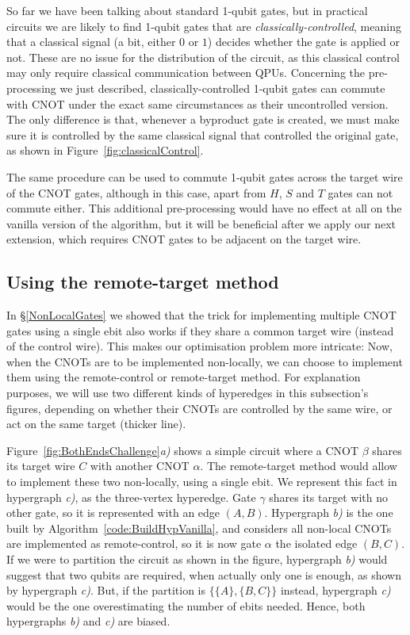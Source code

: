 So far we have been talking about standard 1-qubit gates, but in practical circuits we are likely to find 1-qubit gates that are \textit{classically-controlled}, meaning that a classical signal (a bit, either \(0\) or \(1\)) decides whether the gate is applied or not. These are no issue for the distribution of the circuit, as this classical control may only require classical communication between QPUs. Concerning the pre-processing we just described, classically-controlled 1-qubit gates can commute with CNOT under the exact same circumstances as their uncontrolled version. The only difference is that, whenever a byproduct gate is created, we must make sure it is controlled by the same classical signal that controlled the original gate, as shown in Figure~\ref{fig:classicalControl}.



The same procedure can be used to commute 1-qubit gates across the target wire of the CNOT gates, although in this case, apart from \(H\), \(S\) and \(T\) gates can not commute either. This additional pre-processing would have no effect at all on the vanilla version of the algorithm, but it will be beneficial after we apply our next extension, which requires CNOT gates to be adjacent on the target wire.


\subsection{Using the remote-target method}
\label{BothEnds}

In \S\ref{NonLocalGates} we showed that the trick for implementing multiple CNOT gates using a single ebit also works if they share a common target wire (instead of the control wire). This makes our optimisation problem more intricate: Now, when the CNOTs are to be implemented non-locally, we can choose to implement them using the remote-control or remote-target method. For explanation purposes, we will use two different kinds of hyperedges in this subsection's figures, depending on whether their CNOTs are controlled by the same wire, or act on the same target (thicker line). 



Figure~\ref{fig:BothEndsChallenge}\textit{a)} shows a simple circuit where a CNOT \(\beta\) shares its target wire \(C\) with another CNOT \(\alpha\). The remote-target method would allow to implement these two non-locally, using a single ebit. We represent this fact in hypergraph \textit{c)}, as the three-vertex hyperedge. Gate \(\gamma\) shares its target with no other gate, so it is represented with an edge \((A,B)\). Hypergraph \textit{b)} is the one built by Algorithm~\ref{code:BuildHypVanilla}, and considers all non-local CNOTs are implemented as remote-control, so it is now gate \(\alpha\) the isolated edge \((B,C)\). If we were to partition the circuit as shown in the figure, hypergraph \textit{b)} would suggest that two qubits are required, when actually only one is enough, as shown by hypergraph \textit{c)}. But, if the partition is \(\{\{A\},\{B,C\}\}\) instead, hypergraph \textit{c)} would be the one overestimating the number of ebits needed. Hence, both hypergraphs \textit{b)} and \textit{c)} are biased. 

